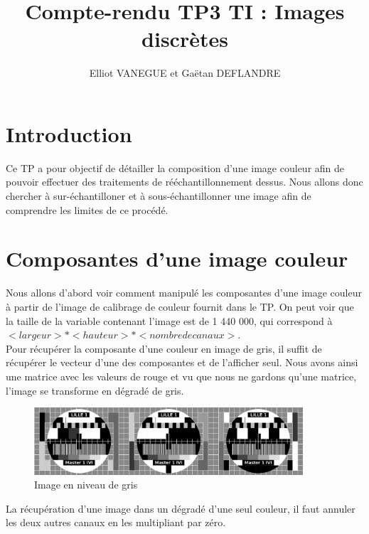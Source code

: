 \documentclass[a4paper,11pt]{article}
\title{Compte-rendu TP3 TI : Images discrètes}
\author{Elliot VANEGUE et Gaëtan DEFLANDRE}
\begin{document}


  \maketitle
  
  \mbox{}
  \newpage
  \clearpage
  
  \section*{Introduction}
  Ce TP a pour objectif de détailler la composition d'une image couleur afin de pouvoir 
  effectuer des traitements de rééchantillonnement dessus. Nous allons donc chercher à sur-échantilloner et à 
  sous-échantillonner une image afin de comprendre les limites de ce procédé.
  
  \section{Composantes d'une image couleur}
  Nous allons d'abord voir comment manipulé les composantes d'une image couleur à partir de l'image de calibrage
  de couleur fournit dans le TP. On peut voir que la taille de la variable contenant l'image est de 1 440 000,
  qui correspond à $<largeur> * <hauteur> * <nombre de canaux>$.\\
  
  Pour récupérer la composante d'une couleur en image de gris, il suffit de récupérer le vecteur d'une des composantes
  et de l'afficher seul. Nous avons ainsi une matrice avec les valeurs de rouge et vu que nous ne gardons qu'une matrice,
  l'image se transforme en dégradé de gris.\\
  
  \begin{figure}[H]
    \center
    \includegraphics[width=10cm]{../mire_gris.png}
    \caption{Image en niveau de gris}
  \end{figure}
  
  La récupération d'une image dans un dégradé d'une seul couleur, il faut annuler les deux autres canaux en les multipliant par
  zéro.
  
\end{document}
